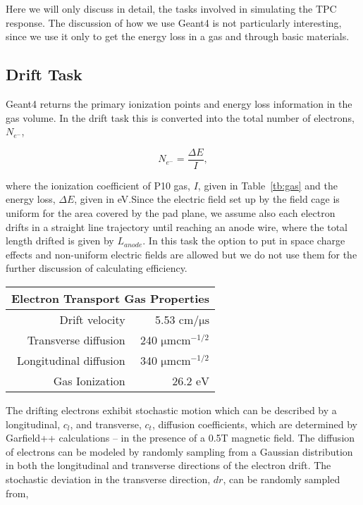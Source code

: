 Here we will only discuss in detail, the tasks involved in simulating the TPC response. The discussion of how we use Geant4 is not particularly interesting, since we use it only to get the energy loss in a gas and through basic materials. 

\subsection{Drift Task}
Geant4 returns the primary ionization points and energy loss information in the gas volume. In the drift task this is converted into the total number of electrons, $N_{e^-}$,

\begin{equation}
N_{e^{-}} =  \frac{\Delta E}{I},
\label{eq:kev2el}
\end{equation}
 
where the ionization coefficient of P10 gas, $I$, given in Table~\ref{tb:gas} and the energy loss, $\Delta E$, given in \si{\electronvolt}.Since the electric field set up by the field cage is uniform for the area covered by the pad plane, we assume also each electron drifts in a straight line trajectory until reaching an anode wire, where the total length drifted is given by $L_{anode}$. In this task the option to put in space charge effects and non-uniform electric fields are allowed but we do not use them for the further discussion of calculating efficiency. 


\begin{table*}\centering
{}
\begin{tabular}{@{}rr@{}}\toprule 
\multicolumn{2}{c}{Electron Transport Gas Properties} \\
 \midrule
Drift velocity & 5.53 $\si{\centi\meter\per\micro\second}$\\
Transverse diffusion & 240 $\si{\micro \meter \centi\meter}^{-1/2}$\\
Longitudinal diffusion &  340 $\si{\micro \meter \centi\meter}^{-1/2}$\\
Gas Ionization & 26.2 $\si{\eV}$\\
\bottomrule
\end{tabular}
\caption{An overview of the properties of the TPC}
\label{tb:gas}
\end{table*}

The drifting electrons exhibit stochastic motion which can be described by a longitudinal, $c_{l}$, and transverse, $c_{t}$, diffusion coefficients, which are determined by Garfield++ calculations -- in the presence of a 0.5T magnetic field. The diffusion of electrons can be modeled by randomly sampling from a Gaussian distribution in both the longitudinal and transverse directions of the electron drift. The stochastic deviation in the transverse direction, $dr$, can be randomly sampled from,

